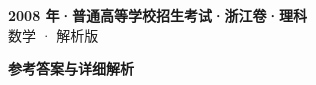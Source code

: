 \documentclass[zihao=-4, a4paper]{ctexart}
\begin{document}
\begin{center}
  {\Large\bfseries 2008 年·普通高等学校招生考试·浙江卷·理科}\\[4pt]
  {\large 数学 · 解析版}
\end{center}
\medskip
{}

\clearpage
{}
\begin{center}{\Large\bfseries 参考答案与详细解析}\end{center}
\medskip

\end{document}
